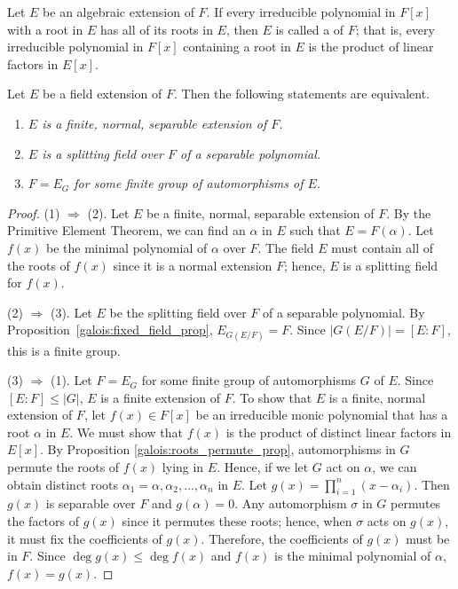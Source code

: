  
\medskip
 
 
Let $E$ be an algebraic extension of $F$. If every irreducible
polynomial in $F[x]$ with a root in $E$ has all of its roots in
$E$, then $E$ is called a  of $F$;
that is, every irreducible polynomial in $F[x]$ containing a root in
$E$ is the product of linear factors in $E[x]$. 
 
 
\begin{theorem}
Let $E$ be a field extension of $F$. Then the following statements are
equivalent.
\begin{enumerate}
 
\rm \item \it
$E$ is a finite, normal, separable extension of $F$.
 
\rm \item \it
$E$ is a splitting field over $F$ of a separable polynomial.
 
\rm \item \it
$F = E_G$ for some finite group of automorphisms of $E$.
 
\end{enumerate}
\end{theorem}
 
 
\begin{proof}
(1) $\Rightarrow$ (2). 
Let $E$ be a finite, normal, separable extension of $F$. By the
Primitive Element Theorem, we can find an  $\alpha$ in $E$ such that
$E = F(\alpha)$. Let $f(x)$ be the minimal polynomial of $\alpha$ over
$F$. The field $E$ must contain all of the roots of $f(x)$ since it is
a normal extension $F$; hence, $E$ is a splitting field for $f(x)$.
 
 
(2) $\Rightarrow$ (3). 
Let $E$ be the splitting field over $F$ of a separable polynomial. By
Proposition~\ref{galois:fixed_field_prop}, $E_{G(E/F)} = F$. Since $| G(E/F)| = [E:F]$, this is
a finite group. 
 
(3) $\Rightarrow$ (1). 
Let $F = E_G$ for some finite group of automorphisms $G$ of $E$. Since
$[E:F] \leq |G|$, $E$ is a finite extension of $F$. To show that $E$
is a finite, normal extension of  $F$, let $f(x) \in F[x]$ be an
irreducible monic polynomial that has a root $\alpha$ in $E$. We must
show that $f(x)$ is the product of distinct linear factors in $E[x]$.
By Proposition \ref{galois:roots_permute_prop}, automorphisms in $G$ permute the roots of $f(x)$
lying in $E$. Hence, if we let $G$ act on $\alpha$, we can obtain
distinct roots $\alpha_1 = \alpha, \alpha_2, \ldots, \alpha_n$ in $E$.
Let $g(x) = \prod_{i=1}^{n} (x -\alpha_i)$. Then $g(x)$ is separable
over $F$ and $g( \alpha ) = 0$. Any automorphism $\sigma$ in $G$
permutes the factors of $g(x)$ since it permutes these roots; hence,
when $\sigma$ acts on $g(x)$, it must fix the coefficients of $g(x)$.
Therefore, the coefficients of $g(x)$ must be in $F$. Since $\deg g(x)
\leq \deg f(x)$ and $f(x)$ is the minimal polynomial of $\alpha$,
$f(x) = g(x)$.
\end{proof}
 
